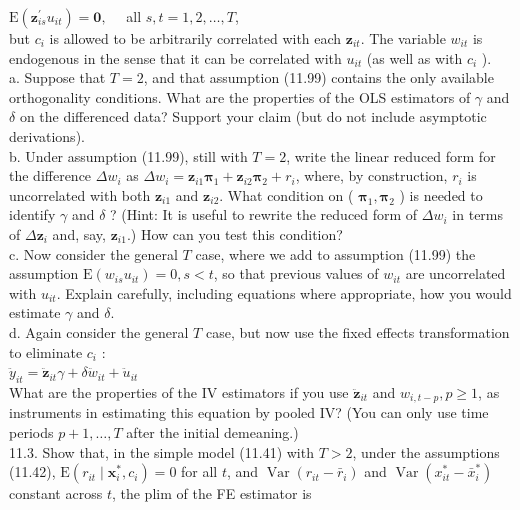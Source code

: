 \documentclass[10pt]{article}
\begin{document}
$\mathrm{E}\left(\mathbf{z}_{i s}^{\prime} u_{i t}\right)=\mathbf{0}, \quad$ all $s, t=1,2, \ldots, T$,\\
but $c_{i}$ is allowed to be arbitrarily correlated with each $\mathbf{z}_{i t}$. The variable $w_{i t}$ is endogenous in the sense that it can be correlated with $u_{i t}$ (as well as with $c_{i}$ ).\\
a. Suppose that $T=2$, and that assumption (11.99) contains the only available orthogonality conditions. What are the properties of the OLS estimators of $\gamma$ and $\delta$ on the differenced data? Support your claim (but do not include asymptotic derivations).\\
b. Under assumption (11.99), still with $T=2$, write the linear reduced form for the difference $\Delta w_{i}$ as $\Delta w_{i}=\mathbf{z}_{i 1} \boldsymbol{\pi}_{1}+\mathbf{z}_{i 2} \boldsymbol{\pi}_{2}+r_{i}$, where, by construction, $r_{i}$ is uncorrelated with both $\mathbf{z}_{i 1}$ and $\mathbf{z}_{i 2}$. What condition on ( $\boldsymbol{\pi}_{1}, \boldsymbol{\pi}_{2}$ ) is needed to identify $\gamma$ and $\delta$ ? (Hint: It is useful to rewrite the reduced form of $\Delta w_{i}$ in terms of $\Delta \mathbf{z}_{i}$ and, say, $\mathbf{z}_{i 1}$.) How can you test this condition?\\
c. Now consider the general $T$ case, where we add to assumption (11.99) the assumption $\mathrm{E}\left(w_{i s} u_{i t}\right)=0, s<t$, so that previous values of $w_{i t}$ are uncorrelated with $u_{i t}$. Explain carefully, including equations where appropriate, how you would estimate $\gamma$ and $\delta$.\\
d. Again consider the general $T$ case, but now use the fixed effects transformation to eliminate $c_{i}$ :\\
$\ddot{y}_{i t}=\ddot{\mathbf{z}}_{i t} \gamma+\delta \ddot{w}_{i t}+\ddot{u}_{i t}$\\
What are the properties of the IV estimators if you use $\ddot{\mathbf{z}}_{i t}$ and $w_{i, t-p}, p \geq 1$, as instruments in estimating this equation by pooled IV? (You can only use time periods $p+1, \ldots, T$ after the initial demeaning.)\\
11.3. Show that, in the simple model (11.41) with $T>2$, under the assumptions (11.42), $\mathrm{E}\left(r_{i t} \mid \mathbf{x}_{i}^{*}, c_{i}\right)=0$ for all $t$, and $\operatorname{Var}\left(r_{i t}-\bar{r}_{i}\right)$ and $\operatorname{Var}\left(x_{i t}^{*}-\bar{x}_{i}^{*}\right)$ constant across $t$, the plim of the FE estimator is\\
\end{document}
